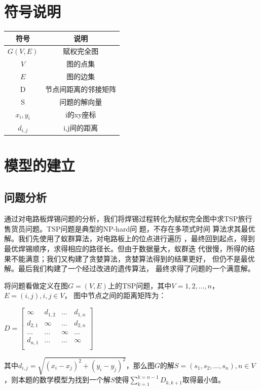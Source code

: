 \documentclass[fontset=windows,a4paper,12pt]{ctexart}
\begin{document}
  \section{符号说明}
    \begin{center}
	  \begin{tabular}{|c|c|}
	  	\hline
	  	符号 & 说明 \\ 
	  	\hline 
	  	$G(V,E)$	&	赋权完全图\\
	  	$V$		& 图的点集\\
	  	$E$		& 图的边集\\
	  	D	&	节点间距离的邻接矩阵\\
	  	S	&	问题的解向量\\
	  	$x_i,y_i$	& i的xy座标\\
	  	$d_{i,j}$ & i,j间的距离\\
	  	\hline
	  \end{tabular} 
	\end{center}

  \section{模型的建立}
    \subsection{问题分析}
      通过对电路板焊锡问题的分析，我们将焊锡过程转化为赋权完全图中求TSP旅行
      售货员问题。TSP问题是典型的NP-hard问
      题\cite{gutin2006traveling}，不存在多项式时间
      算法求其最优解。我们先使用了蚁群算法，对电路板上的位点进行遍历
      ，最终回到起点，得到最优焊锡顺序，求得相应的路径长。但由于数据量大，蚁群迭
      代很慢，所得的结果不能满意；我们又构建了贪婪算法，贪婪算法得到的结果更好，
      但仍不是最优解。最后我们构建了一个经过改进的遗传算法\cite{楼建华2003数学建模与数学实验}，
      最终求得了问题的一个满意解。
      
      将问题看做定义在图$G=(V,E)$上的TSP问题，其中$V={1,2,\dots,n}$，$E=(i,j),i,j\in V$，
      图中节点之间的距离矩阵为：
      \begin{center}
      	      \begin{math}
      	      D=\left[
      	      \begin{array}{cccc}
      	      \infty & d_{1,2} & \dots & d_{1,n}\\
      	      d_{2,1} & \infty & \dots & d_{2,n}\\
      	      \dots & \dots & \infty & \dots \\
      	      d_{n,1} & \dots & \dots & \infty \\
      	      \end{array}
      	      \right]
      	      \end{math}
      \end{center}
	  其中$d_{i,j}=\sqrt{(x_i-x_j)^2+(y_i-y_j)^2}$，那么图$G$的解$S=(s_1,s_2,\dots,s_n),n \in V$，则本题的数学模型为找到一个解$S$使得$\sum_{k=1}^{k=n-1}D_{k,k+1}$取得最小值。
\end{document}
